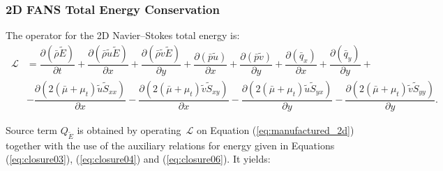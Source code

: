 \documentclass[10pt]{article}
\newcommand{\Diff}[2] {\dfrac{\partial( #1)}{\partial #2}}
\newcommand{\Lo}{\,\mathcal{L}}
\newcommand{\brho}{\bar{\rho}}
\newcommand{\bp}{\bar{p}}
\newcommand{\bq}{\bar{q}}
\newcommand{\tu}{\tilde{u}}
\newcommand{\tv}{\tilde{v}}
\newcommand{\tS}{\tilde{S}}
\newcommand{\tE}{\tilde{E}}
\newcommand{\bmu}{\bar{\mu}}
\begin{document}
\subsubsection{2D FANS Total Energy Conservation}

The operator for the 2D Navier--Stokes total energy is:
\begin{equation*}
\begin{split}
\Lo&=  \Diff{\brho \tE }{t}+ \Diff{\brho \tu \tE }{x}+\Diff{\brho \tv \tE}{y}+\Diff{\bp\tu}{x} +\Diff{\bp\tv}{y} + \Diff{\bq_x}{x} +\Diff{\bq_y}{y} +\\
  &-\Diff{2(\bmu+\mu_t)\tu \tS_{xx}}{x}-\Diff{2(\bmu+\mu_t)\tv \tS_{xy}}{x}-\Diff{2(\bmu+\mu_t) \tu \tS_{yx}}{y}-\Diff{2(\bmu+\mu_t)\tv \tS_{yy}}{y}.
\end{split}
\end{equation*}

Source term $Q_{\tE}$ is obtained by operating $\Lo$ on Equation  (\ref{eq:manufactured_2d}) together with the use of the  auxiliary relations for energy given in Equations (\ref{eq:closure03}), (\ref{eq:closure04}) and (\ref{eq:closure06}). It yields:
\end{document}
